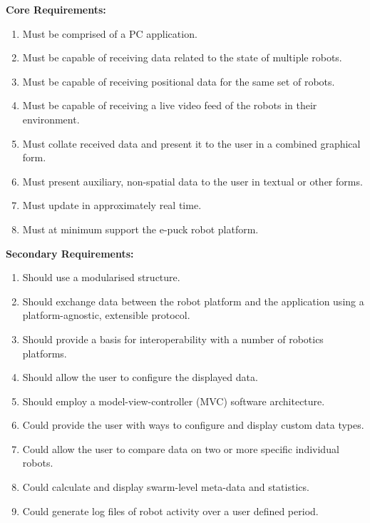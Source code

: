 \textbf{Core Requirements:}
\begin{enumerate}
	\item Must be comprised of a PC application.
	\item Must be capable of receiving data related to the state of multiple robots.
	\item Must be capable of receiving positional data for the same set of robots.
	\item Must be capable of receiving a live video feed of the robots in their environment.
	\item Must collate received data and present it to the user in a combined graphical form.
	\item Must present auxiliary, non-spatial data to the user in textual or other forms.
	\item Must update in approximately real time.
	\item Must at minimum support the e-puck robot platform.
\end{enumerate}

\textbf{Secondary Requirements:}
\begin{enumerate}
	\item Should use a modularised structure.
	\item Should exchange data between the robot platform and the application using a platform-agnostic, extensible protocol.
	\item Should provide a basis for interoperability with a number of robotics platforms.
	\item Should allow the user to configure the displayed data.
	\item Should employ a model-view-controller (MVC) software architecture.
	\item Could provide the user with ways to configure and display custom data types.
	\item Could allow the user to compare data on two or more specific individual robots.
	\item Could calculate and display swarm-level meta-data and statistics.
	\item Could generate log files of robot activity over a user defined period.
\end{enumerate}


